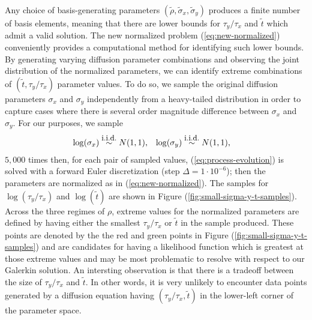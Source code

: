 \documentclass[10pt]{article}
\begin{document}
\begin{enumerate}
Any choice of basis-generating parameters
$(\tilde{\rho}, \tilde{\sigma}_x, \tilde{\sigma}_y)$ produces a finite
number of basis elements, meaning that there are lower bounds for
$\tau_y/\tau_x$ and $\tilde{t}$ which admit a valid solution. The new
normalized problem (\ref{eq:new-normalized}) conveniently provides a
computational method for identifying such lower bounds. By generating
varying diffusion parameter combinations and observing the joint
distribution of the normalized parameters, we can identify extreme
combinations of $(\tilde{t}, \tau_y/\tau_x)$ parameter values. To do
so, we sample the original diffusion parameters $\sigma_x$ and
$\sigma_y$ independently from a heavy-tailed distribution in order to
capture cases where there is several order magnitude difference
between $\sigma_x$ and $\sigma_y$. For our purposes, we sample
\begin{align}
  \log(\sigma_x) &\overset{\mbox{\small i.i.d.}}{\sim} N(1,1), &
  \log(\sigma_y) &\overset{\mbox{\small i.i.d.}}{\sim} N(1,1),
\end{align}
$5,000$ times then, for each pair of sampled values,
(\ref{eq:process-evolution}) is solved with a forward Euler
discretization (step $\Delta = 1\cdot 10^{-6}$); then the parameters
are normalized as in (\ref{eq:new-normalized}). The samples for
$\log(\tau_y/\tau_x)$ and $\log(\tilde{t})$ are shown in Figure
(\ref{fig:small-sigma-y-t-samples}). Across the three regimes of
$\rho$, extreme values for the normalized parameters are defined by
having either the smallest $\tau_y/\tau_x$ or $\tilde{t}$ in the
sample produced. These points are denoted by the the red and green
points in Figure (\ref{fig:small-sigma-y-t-samples}) and are
candidates for having a likelihood function which is greatest at those
extreme values and may be most problematic to resolve with respect to
our Galerkin solution. An intersting observation is that there is a
tradeoff between the size of $\tau_y/\tau_x$ and $\tilde{t}$. In other
words, it is very unlikely to encounter data points generated by a diffusion
equation having $(\tau_y/\tau_x, \tilde{t})$ in the lower-left corner
of the parameter space.


\end{enumerate}
\end{document}
